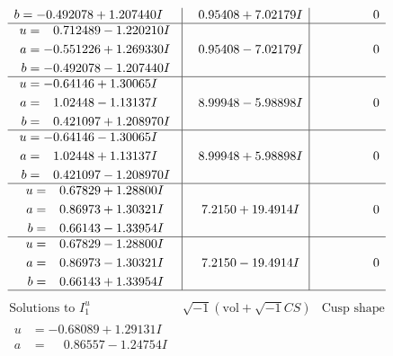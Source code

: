 \documentclass[1p]{elsarticle_modified}
\theoremstyle{definition}
\newcommand{\I}{\sqrt{-1}}
\begin{document}
$$\begin{array}{c|c|c}
\begin{aligned}
b &= -0.492078 + 1.207440 I\end{aligned}
 & \phantom{-}0.95408 + 7.02179 I & \phantom{-0.000000 } 0 \\ \hline\begin{aligned}
u &= \phantom{-}0.712489 - 1.220210 I \\
a &= -0.551226 + 1.269330 I \\
b &= -0.492078 - 1.207440 I\end{aligned}
 & \phantom{-}0.95408 - 7.02179 I & \phantom{-0.000000 } 0 \\ \hline\begin{aligned}
u &= -0.64146 + 1.30065 I \\
a &= \phantom{-}1.02448 - 1.13137 I \\
b &= \phantom{-}0.421097 + 1.208970 I\end{aligned}
 & \phantom{-}8.99948 - 5.98898 I & \phantom{-0.000000 } 0 \\ \hline\begin{aligned}
u &= -0.64146 - 1.30065 I \\
a &= \phantom{-}1.02448 + 1.13137 I \\
b &= \phantom{-}0.421097 - 1.208970 I\end{aligned}
 & \phantom{-}8.99948 + 5.98898 I & \phantom{-0.000000 } 0 \\ \hline\begin{aligned}
u &= \phantom{-}0.67829 + 1.28800 I \\
a &= \phantom{-}0.86973 + 1.30321 I \\
b &= \phantom{-}0.66143 - 1.33954 I\end{aligned}
 & \phantom{-}7.2150 + 19.4914 I & \phantom{-0.000000 } 0 \\ \hline\begin{aligned}
u &= \phantom{-}0.67829 - 1.28800 I \\
a &= \phantom{-}0.86973 - 1.30321 I \\
b &= \phantom{-}0.66143 + 1.33954 I\end{aligned}
 & \phantom{-}7.2150 - 19.4914 I & \phantom{-0.000000 } 0\\
 \hline 
 \end{array}$$\newpage$$\begin{array}{c|c|c}  
\text{Solutions to }I^u_{1}& \I (\text{vol} + \sqrt{-1}CS) & \text{Cusp shape}\\
 \hline 
\begin{aligned}
u &= -0.68089 + 1.29131 I \\
a &= \phantom{-}0.86557 - 1.24754 I \\

\end{aligned}
\end{array}$$
\end{document}
